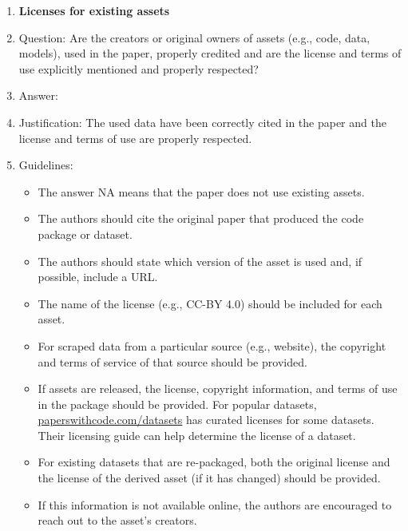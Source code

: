 \documentclass{article}
\begin{document}
\begin{enumerate}
\item {\bf Licenses for existing assets}
    \item[] Question: Are the creators or original owners of assets (e.g., code, data, models), used in the paper, properly credited and are the license and terms of use explicitly mentioned and properly respected?
    \item[] Answer: \answerYes{} %
    \item[] Justification:  The used data have been correctly cited in the paper and the license and terms of use are properly respected.
    \item[] Guidelines:
    \begin{itemize}
        \item The answer NA means that the paper does not use existing assets.
        \item The authors should cite the original paper that produced the code package or dataset.
        \item The authors should state which version of the asset is used and, if possible, include a URL.
        \item The name of the license (e.g., CC-BY 4.0) should be included for each asset.
        \item For scraped data from a particular source (e.g., website), the copyright and terms of service of that source should be provided.
        \item If assets are released, the license, copyright information, and terms of use in the package should be provided. For popular datasets, \url{paperswithcode.com/datasets} has curated licenses for some datasets. Their licensing guide can help determine the license of a dataset.
        \item For existing datasets that are re-packaged, both the original license and the license of the derived asset (if it has changed) should be provided.
        \item If this information is not available online, the authors are encouraged to reach out to the asset's creators.
    \end{itemize}


\end{enumerate}
\end{document}
